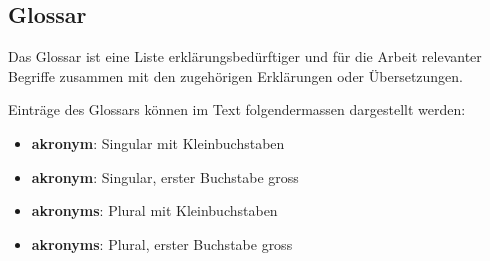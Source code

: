 	\subsection{Glossar}\label{acronymsandglossary.glossaries}
	Das Glossar ist eine Liste erklärungsbedürftiger und für die Arbeit
	relevanter Begriffe zusammen mit den zugehörigen Erklärungen oder
	Übersetzungen.
	
	
	Einträge des Glossars können im Text folgendermassen dargestellt werden:
	\begin{itemize}
		\item \textbf{\gls{akronym}}: Singular mit Kleinbuchstaben
		\item \textbf{\Gls{akronym}}: Singular, erster Buchstabe gross
		\item \textbf{\glspl{akronym}}: Plural mit Kleinbuchstaben
		\item \textbf{\Glspl{akronym}}: Plural, erster Buchstabe gross
	\end{itemize}

\fi


